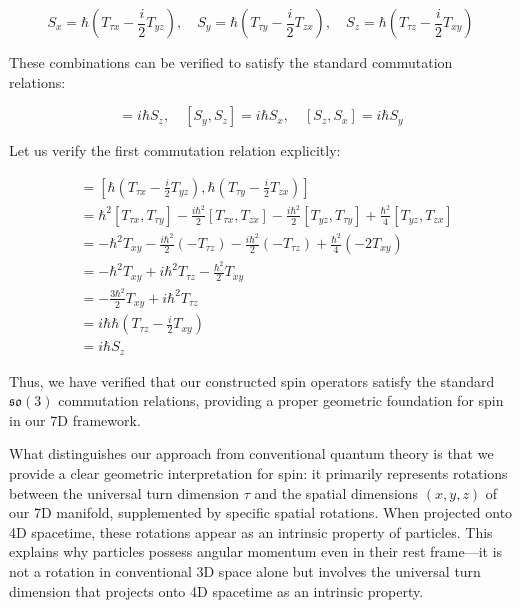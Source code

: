 \documentclass{article}
\begin{document}
\begin{equation}
S_x = \hbar(T_{\tau x} - \frac{i}{2}T_{yz}), \quad 
S_y = \hbar(T_{\tau y} - \frac{i}{2}T_{zx}), \quad 
S_z = \hbar(T_{\tau z} - \frac{i}{2}T_{xy})
\end{equation}

These combinations can be verified to satisfy the standard commutation relations:

\begin{equation}
[S_x, S_y] = i\hbar S_z, \quad [S_y, S_z] = i\hbar S_x, \quad [S_z, S_x] = i\hbar S_y
\end{equation}

Let us verify the first commutation relation explicitly:

\begin{align}
[S_x, S_y] &= [\hbar(T_{\tau x} - \frac{i}{2}T_{yz}), \hbar(T_{\tau y} - \frac{i}{2}T_{zx})] \\
&= \hbar^2[T_{\tau x}, T_{\tau y}] - \frac{i\hbar^2}{2}[T_{\tau x}, T_{zx}] - \frac{i\hbar^2}{2}[T_{yz}, T_{\tau y}] + \frac{\hbar^2}{4}[T_{yz}, T_{zx}] \\
&= -\hbar^2 T_{xy} - \frac{i\hbar^2}{2}(-T_{\tau z}) - \frac{i\hbar^2}{2}(-T_{\tau z}) + \frac{\hbar^2}{4}(-2T_{xy}) \\
&= -\hbar^2 T_{xy} + i\hbar^2 T_{\tau z} - \frac{\hbar^2}{2}T_{xy} \\
&= -\frac{3\hbar^2}{2}T_{xy} + i\hbar^2 T_{\tau z} \\
&= i\hbar \hbar(T_{\tau z} - \frac{i}{2}T_{xy}) \\
&= i\hbar S_z
\end{align}

Thus, we have verified that our constructed spin operators satisfy the standard $\mathfrak{so}(3)$ commutation relations, providing a proper geometric foundation for spin in our 7D framework.

What distinguishes our approach from conventional quantum theory is that we provide a clear geometric interpretation for spin: it primarily represents rotations between the universal turn dimension $\tau$ and the spatial dimensions $(x,y,z)$ of our 7D manifold, supplemented by specific spatial rotations. When projected onto 4D spacetime, these rotations appear as an intrinsic property of particles. This explains why particles possess angular momentum even in their rest frame—it is not a rotation in conventional 3D space alone but involves the universal turn dimension that projects onto 4D spacetime as an intrinsic property.
\end{document}

